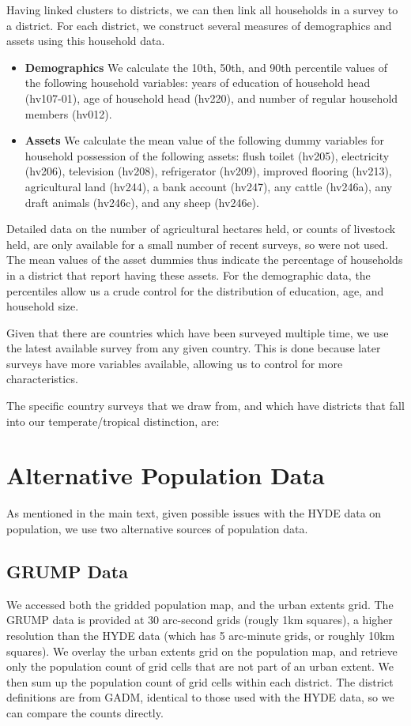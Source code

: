 \documentclass[11pt]{article}
\begin{document}
Having linked clusters to districts, we can then link all households in a survey to a district. For each district, we construct several measures of demographics and assets using this household data. 
\begin{itemize}
    \item \textbf{Demographics} We calculate the 10th, 50th, and 90th percentile values of the following household variables: years of education of household head (hv107-01), age of household head (hv220), and number of regular household members (hv012).
    \item \textbf{Assets} We calculate the mean value of the following dummy variables for household possession of the following assets: flush toilet (hv205), electricity (hv206), television (hv208), refrigerator (hv209), improved flooring (hv213), agricultural land (hv244), a bank account (hv247), any cattle (hv246a), any draft animals (hv246c), and any sheep (hv246e). 
\end{itemize}

Detailed data on the number of agricultural hectares held, or counts of livestock held, are only available for a small number of recent surveys, so were not used. The mean values of the asset dummies thus indicate the percentage of households in a district that report having these assets. For the demographic data, the percentiles allow us a crude control for the distribution of education, age, and household size.

Given that there are countries which have been surveyed multiple time, we use the latest available survey from any given country. This is done because later surveys have more variables available, allowing us to control for more characteristics.

The specific country surveys that we draw from, and which have districts that fall into our temperate/tropical distinction, are:
 

\section{Alternative Population Data}
As mentioned in the main text, given possible issues with the HYDE data on population, we use two alternative sources of population data.

\subsection{GRUMP Data}
We accessed both the gridded population map, and the urban extents grid. The GRUMP data is provided at 30 arc-second grids (rougly 1km squares), a higher resolution than the HYDE data (which has 5 arc-minute grids, or roughly 10km squares). We overlay the urban extents grid on the population map, and retrieve only the population count of grid cells that are not part of an urban extent. We then sum up the population count of grid cells within each district. The district definitions are from GADM, identical to those used with the HYDE data, so we can compare the counts directly.
\end{document}
